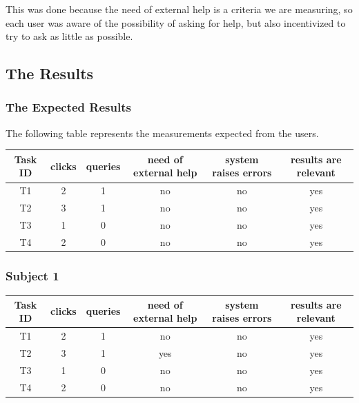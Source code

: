 \documentclass[unicode,9pt,a4paper,oneside,numbers=endperiod,openany]{scrartcl}
\begin{document}
This was done because the need of external help is a criteria we are measuring, so each user was aware of the possibility of asking for help, but also incentivized to try to ask as little as possible.

\subsection{The Results}

\subsubsection{The Expected Results}

The following table represents the measurements expected from the users.
\newline

\begin{tabular}{c|c|c|c|c|c}
    Task ID & clicks & queries & need of external help & system raises errors & results are relevant \\ \hline
    T1      & 2      & 1       & no                    & no                   & yes                  \\
    T2      & 3      & 1       & no                    & no                   & yes                  \\
    T3      & 1      & 0       & no                    & no                   & yes                  \\
    T4      & 2      & 0       & no                    & no                   & yes                  \\
\end{tabular}

\subsubsection{Subject 1}

\begin{tabular}{c|c|c|c|c|c}
    Task ID & clicks & queries & need of external help & system raises errors & results are relevant \\ \hline
    T1      & 2      & 1       & no                    & no                   & yes                  \\
    T2      & 3      & 1       & yes                   & no                   & yes                  \\
    T3      & 1      & 0       & no                    & no                   & yes                  \\
    T4      & 2      & 0       & no                    & no                   & yes                  \\
\end{tabular}
\end{document}
